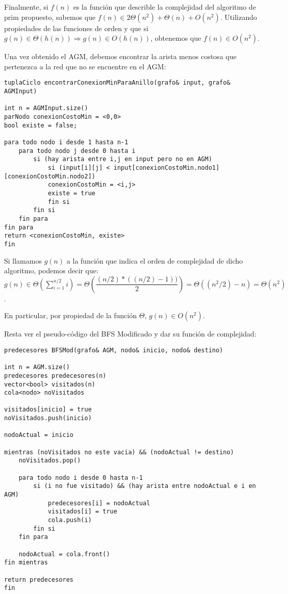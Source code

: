 Finalmente, si $f(n)$ es la función que describle la complejidad del algoritmo de prim propuesto, sabemos que $f(n) \in 2\Theta(n^2) + \Theta(n) +  O(n^2)$. Utilizando propiedades de las funciones de orden y que si $g(n) \in \Theta(h(n)) \Rightarrow g(n) \in O(h(n))$, obtenemos que $f(n) \in O(n^2)$.

Una vez obtenido el AGM, debemos encontrar la arista menos costosa que pertenezca a la red que no se encuentre en el AGM:

\begin{lstlisting}
tuplaCiclo encontrarConexionMinParaAnillo(grafo& input, grafo& AGMInput)

int n = AGMInput.size()
parNodo conexionCostoMin = <0,0>
bool existe = false;

para todo nodo i desde 1 hasta n-1
	para todo nodo j desde 0 hasta i
		si (hay arista entre i,j en input pero no en AGM)
			si (input[i][j] < input[conexionCostoMin.nodo1][conexionCostoMin.nodo2])
			conexionCostoMin = <i,j>
			existe = true
			fin si
		fin si
	fin para
fin para
return <conexionCostoMin, existe>
fin
\end{lstlisting}

Si llamamos $g(n)$ a la función que indica el orden de complejidad de dicho algoritmo, podemos decir que: 
$g(n) \in \Theta(\sum\limits_{i=1}^{n/2} i) = \Theta(\dfrac{(n/2)*((n/2) - 1))}{2}) = \Theta((n^2/2) - n) = \Theta(n^2)$. 

\noindent En particular, por propiedad de la función $\Theta$, $g(n) \in O(n^2)$.


Resta ver el pseudo-código del BFS Modificado y dar su función de complejidad:

\begin{lstlisting}
predecesores BFSMod(grafo& AGM, nodo& inicio, nodo& destino)

int n = AGM.size()
predecesores predecesores(n)
vector<bool> visitados(n)
cola<nodo> noVisitados

visitados[inicio] = true
noVisitados.push(inicio)

nodoActual = inicio

mientras (noVisitados no este vacia) && (nodoActual != destino)
	noVisitados.pop()
	
	para todo nodo i desde 0 hasta n-1
		si (i no fue visitado) && (hay arista entre nodoActual e i en AGM)
			predecesores[i] = nodoActual
			visitados[i] = true
			cola.push(i)
		fin si
	fin para
	
	nodoActual = cola.front()
fin mientras

return predecesores
fin
\end{lstlisting}

